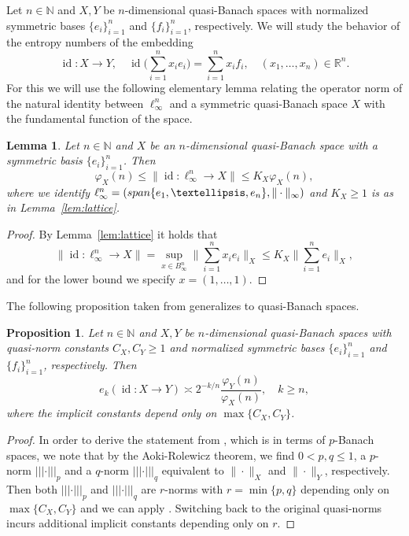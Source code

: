 \documentclass[a4paper,12pt]{article}
\newtheorem{lem}[thm]{Lemma}
\newtheorem{prop}[thm]{Proposition}
\theoremstyle{definition}
\newcommand{\N}{\mathbb{N}}
\newcommand{\IN}{\mathbb{N}}
\newcommand{\IR}{\mathbb{R}}
\DeclareMathOperator{\id}{id}
\begin{document}
Let $n\in\IN$ and $X, Y$ be $n$-dimensional quasi-Banach spaces with normalized symmetric bases $\{e_i\}_{i=1}^n$ and $\{f_i\}_{i=1}^n$, respectively. We will study the behavior of the entropy numbers of the embedding
\[
\id\colon X\to Y, \quad \id\Big(\sum_{i=1}^{n}x_ie_i\Big)=\sum_{i=1}^{n}x_if_i, \quad (x_1,\dots,x_n)\in\IR^n.
\]
For this we will use the following elementary lemma relating the operator norm of the natural identity between $\ell_\infty^n$ and a symmetric quasi-Banach space $X$ with the fundamental function of the space.

\begin{lem}\label{lem:monotone-fundamental}
Let $n\in\N$ and $X$ be an $n$-dimensional quasi-Banach space with a symmetric basis $\{e_i\}_{i=1}^n$. Then
\[
\varphi_X(n)
\le \|\id\colon \ell_{\infty}^n\to X\|
\le K_X \varphi_X(n),
\]
where we identify $\ell_{\infty}^n=({\rm span}\{e_1,\dots,e_n\},\|\cdot\|_{\infty})$ and $K_X\geq 1$ is as in Lemma~\ref{lem:lattice}.
\end{lem}
\begin{proof}
By Lemma~\ref{lem:lattice} it holds that
\[
\|\id\colon \ell_{\infty}^n\to X\|
=\sup_{x\in B_{\infty}^n}\Big\|\sum_{i=1}^{n}x_i e_i\Big\|_X
\le K_X \Big\|\sum_{i=1}^{n}e_i\Big\|_X,
\]
and for the lower bound we specify $x=(1,\dots,1)$.
\end{proof}

The following proposition taken from \cite[Theorem~4.2]{Kae17} generalizes \cite[Lemma 4]{Sch84} to quasi-Banach spaces. 

\begin{prop}\label{pro:fundamental}
Let $n\in\IN$ and $X, Y$ be $n$-dimensional quasi-Banach spaces with quasi-norm constants $C_X,C_Y\ge 1$ and normalized symmetric bases $\{e_i\}_{i=1}^n$ and $\{f_i\}_{i=1}^n$, respectively. Then
\begin{equation} \label{eq:ent-fundamental}
e_k(\id\colon X\to Y)\asymp 2^{-k/n}\frac{\varphi_Y(n)}{\varphi_X(n)},\quad k\ge n,
\end{equation}
where the implicit constants depend only on $\max\{C_{X},C_{Y}\}$.
\end{prop}

\begin{proof}
In order to derive the statement from \cite[Theorem~4.2]{Kae17}, which is in terms of $p$-Banach spaces, we note that by the Aoki-Rolewicz theorem, we find $0<p,q\le 1$, a $p$-norm $|||\cdot|||_p$ and a $q$-norm $|||\cdot|||_q$ equivalent to $\|\cdot\|_X$ and $\|\cdot\|_Y$, respectively. Then both $|||\cdot|||_p$ and $|||\cdot|||_q$ are $r$-norms with $r=\min\{p,q\}$ depending only on $\max\{C_X,C_Y\}$ and we can apply \cite[Theorem~4.2]{Kae17}. Switching back to the original quasi-norms incurs additional implicit constants depending only on $r$.
\end{proof}
\end{document}
